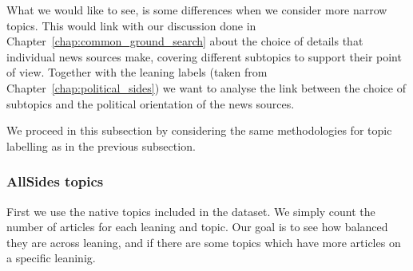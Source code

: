 What we would like to see, is some differences when we consider more narrow topics. This would link with our discussion done in Chapter~\ref{chap:common_ground_search} about the choice of details that individual news sources make, covering different subtopics to support their point of view.
Together with the leaning labels (taken from Chapter~\ref{chap:political_sides}) we want to analyse the link between the choice of subtopics and the political orientation of the news sources.




We proceed in this subsection by considering the same methodologies for topic labelling as in the previous subsection.

\subsubsection{\statusgreen AllSides topics}

First we use the native topics included in the dataset. We simply count the number of articles for each leaning and topic. Our goal is to see how balanced they are across leaning, and if there are some topics which have more articles on a specific leaninig.

